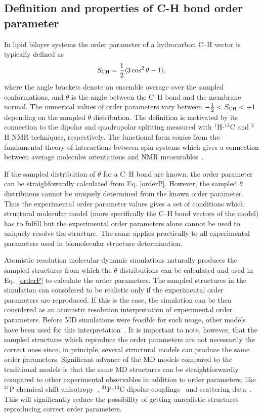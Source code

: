 \documentclass[aps,prl,superscriptaddress,twocolumn]{revtex4}
\begin{document}
\subsection{Definition and properties of C-H bond order parameter}\label{OPdefinition}
In lipid bilayer systems the order parameter of a hydrocarbon C--H vector is typically defined as 
\begin{equation}\label{orderP}
S_{{\rm CH}}=\frac{1}{2}\langle 3 \cos^2 \theta-1 \rangle,
\end{equation} 
where the angle brackets denote an ensemble average over the sampled conformations, and $\theta$ is the 
angle between the C--H bond and the membrane normal.
The numerical values of order parameters vary between $-\frac{1}{2} < S_{{\rm CH}} < +1$
depending on the sampled $\theta$ distribution.
The definition is motivated by its connection to the dipolar and quadrupolar splitting measured with
$^1$H-$^{13}$C and $^2$H NMR techniques, respectively. The functional form comes from 
the fundamental theory of interactions between spin systems which gives a connection between 
average molecules orientations and NMR measurables~\cite{abragam}. 

If the sampled distribution of $\theta$ for a C--H bond are known, the order parameter
can be straighfowardly calculated from Eq. \ref{orderP}. However, the sampled $\theta$ 
distribtions cannot be uniquely determined from the known order parameter. Thus the experimental
order parameter values gives a set of conditions which structural molecular model 
(more specifically the C--H bond vectors of the model) has to fulfill
but the experimental order parameters alone cannot be used to uniquely 
resolve the structure. The same applies practically to all
experimental parameters used in biomolecular structure determination. 

Atomistic resolution molecular dynamic simulations naturally produces the
sampled structures from which the $\theta$ distributions can be calculated and
used in Eq.~\ref{orderP} to calculate the order parameters.
The sampled structures in the simulation can considered to be realistic
only if the experimental order parameters are reproduced.
If this is the case, the simulation can be then considered 
as an atomistic resolution interpretation of experimental order parameters.
Before MD simulations were feasible for such usage, other models have been used for this interpretation~\cite{seelig74,gally75,seelig77,seelig78,strenk85,baenziger91,hong95b,bruzik97}.
It is important to note, however, that the sampled structures which reproduce the order parameters are not 
necessarily the correct ones since, in principle, several structural models can produce the same order parameters. 
Significant advance of the MD models compared to the traditional models is that the same MD 
structures can be straightforwardly compared to other experimental observables in addition to order parameters, 
like $^{31}$P chemical shift anisotropy~\cite{chowdhary13}, $^{31}$P-$^{13}$C dipolar couplings~\cite{prakash10}
and scattering data~\cite{??}. This will significantly reduce the 
possibility of getting unrealistic structures reproducing correct order parameters.
\end{document}
